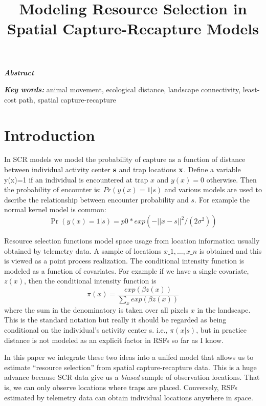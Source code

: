 \documentclass[12pt]{article}
\title{Modeling Resource Selection in Spatial Capture-Recapture Models}
\author{
%
%
}
\begin{document}
\maketitle

\date


\linenumbers


\begin{spacing}{1.8}

\begin{flushleft}
{\em \bf Abstract}

{\em \bf Key words:} animal movement, ecological distance, landscape connectivity,
least-cost path, spatial capture-recapture

\end{flushleft}



\section{Introduction}


In SCR models we model the probability of capture as a function of distance between
individual activity center ${\bf s}$ and trap locations ${\bf x}$. Define a variable
 y(x)=1 if an individual is encountered at trap $x$ and $y(x)=0$ otherwise.
 Then the probability of encounter is:
$Pr(y(x)=1|s)$ and various models are used to dscribe the relationship between encounter
probability and $s$. For example the normal kernel model is common:
\[
\Pr(y(x)=1|s) =  p0*exp(- || x- s||^{2} / (2 \sigma^{2}))
\]

Resource selection functions model space usage from location information usually obtained
by telemetry data.
A sample of locations $x\_{1},\ldots,x\_{n}$ is obtained and this is viewed as a point
process realization. The conditional intensity function is modeled as a function of covariates.
For example if we have a single covariate,
$z(x)$, then the conditional intensity function is
\[
\pi(x) = \frac{ exp( \beta z(x) ) }{
\sum_{x} exp( \beta z(x) ) 
}
\]
where the sum in the denominatory is taken over all pixels $x$ in the landscape. This is the
standard notation but really it should be regarded as being conditional on the individual's
activity center s. i.e., $\pi(x|s)$, but in practice distance is not modeled as an explicit
factor in RSFs so far as I know.


In this paper we integrate these two ideas into a unifed model that allows us to estimate
``resource selection'' from spatial capture-recapture data.
This is a huge advance because SCR data give us a {\it biased} sample of observation locations.
That is, we can only observe locations where traps are placed. 
Conversely, RSFs estimated by telemetry data can obtain individual locations anywhere in space. 


\end{spacing}
\end{document}
